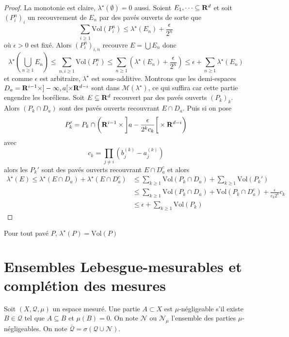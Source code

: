 \begin{proof}
    La monotonie est claire, $\lambda^\star(\emptyset)=0$ aussi. Soient  $E_1, \cdots \subseteq \mathbf R^d$ et soit $(P_i^n)_i$ un recouvrement de $E_n$ par des pavés ouverts de sorte que  \[
        \sum_{i\geq 1}\mathrm{Vol}(P_i^n)\leq \lambda^\star(E_n)+\frac{\epsilon}{2^n}
    \] 
    où $ \epsilon>0$ est fixé. Alors $(P_i^n)_{i,n}$ recouvre $E=\bigcup E_n$ donc \[
        \lambda^\star \left( \bigcup_{n\geq 1}E_n \right) \leq \sum_{n,i\geq 1} \mathrm{Vol}(P_i^n) \leq \sum_{n\geq 1} \left( \lambda^\star(E_n)+ \frac{\epsilon}{2^n} \right)\leq \epsilon + \sum_{n\geq 1}\lambda^\star(E_n)
    \] 
    et comme $\epsilon$ est arbitraire,  $\lambda^\star$ est sous-additive. Montrons que les demi-espaces $D_a=\mathbf R^{i-1}\times ]-\infty, a[\times \mathbf R^{d-i}$ sont dans $\mathcal  M(\lambda^\star)$, ce qui suffira car cette partie engendre les boréliens. Soit $E \subseteq \mathbf R^d$ recouvert par des pavés ouverts $(P_k)_k$. Alors  $(P_k\cap D_a)$ sont des pavés ouverts recouvrant  $E\cap D_a$. Puis si on pose  \[
        P_k'=P_k\cap\left(\mathbf R^{i-1}\times \left]a-\frac{\epsilon}{2^kc_k}\right[\times \mathbf R^{d-i}\right)
    \]
    avec \[c_k=\prod_{j\neq i}(b_j^{(k)}-a_j^{(k)})\] alors les $P_k'$ sont des pavés ouverts recouvrant  $E\cap D_a^c$ et alors  \begin{align*}
    \lambda^\star(E)\leq \lambda^\star(E\cap D_a)+\lambda^\star(E\cap D_a^c)&\leq \sum_{k\geq 1}\mathrm{Vol}(P_k\cap D_a)+\sum_{k\geq 1}\mathrm{Vol}(P_k')\\&\leq \sum_{k\geq 1}\mathrm{Vol}(P_k\cap D_a)+\mathrm{Vol}(P_k\cap D_a^c)+ \frac{\epsilon}{c_k2^k}c_k\\&\leq \epsilon+\sum_{k\geq 1}\mathrm{Vol}(P_k)
\end{align*}
\end{proof}

\begin{prop}
    Pour tout pavé $P$,  $\lambda^\star(P)=\mathrm{Vol}(P)$
\end{prop}

\section{Ensembles Lebesgue-mesurables et complétion des mesures}

\begin{dfn}
    Soit $(X, \mathcal Q, \mu)$ un espace mesuré. Une partie  $A\subset X$ est  $\mu$-négligeable s'il existe  $B \in  \mathcal  Q$ tel que $A\subseteq B$ et  $\mu(B)=0$. On note  $\mathcal  N$ ou $\mathcal N_{\mu}$ l'ensemble des parties $\mu$-négligeables. On note  $\bar{\mathcal  Q} =\sigma(\mathcal  Q\cup \mathcal  N)$.
\end{dfn}

